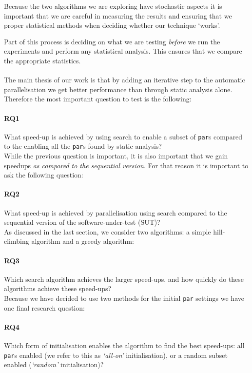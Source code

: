Because the two algorithms we are exploring have stochastic aspects it is
important that we are careful in measuring the results and ensuring that we
proper statistical methods when deciding whether our technique `works'.

Part of this process is deciding on what we are testing \emph{before} we run
the experiments and perform any statistical analysis. This ensures that we
compare the appropriate statistics.

\paragraph{}

The main thesis of our work is that by adding an iterative step to the
automatic parallelisation we get better performance than through static
analysis alone. Therefore the most important question to test is the following:

\paragraph{RQ1} What speed-up is achieved by using search to enable a
subset of \verb-par-s compared to the enabling all the \verb-par-s found by
static analysis?\\


\noindent
While the previous question is important, it is also important that we gain
speedups \emph{as compared to the sequential version}. For that reason it is
important to ask the following question:

\paragraph{RQ2} What speed-up is achieved by parallelisation using search
compared to the sequential version of the software-under-test (SUT)?\\


\noindent
As discussed in the last section, we consider two algorithms: a simple
hill-climbing algorithm and a greedy algorithm:

\paragraph{RQ3} Which search algorithm achieves the larger speed-ups, and
how quickly do these algorithms achieve these speed-ups?\\

\noindent
Because we have decided to use two methods for the initial \verb|par| settings
we have one final research question:

\paragraph{RQ4} Which form of initialisation enables the algorithm to
find the best speed-ups: all \verb-par-s enabled (we refer to this as
\emph{`all-on'} initialisation), or a random subset enabled (\emph{`random'}
initialisation)?
